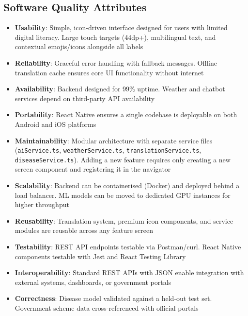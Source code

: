 \documentclass[12pt,a4paper]{article}
\begin{document}
\subsection{Software Quality Attributes}

\begin{itemize}
    \item \textbf{Usability}: Simple, icon-driven interface designed for users with limited digital literacy. Large touch targets (44dp+), multilingual text, and contextual emojis/icons alongside all labels
    \item \textbf{Reliability}: Graceful error handling with fallback messages. Offline translation cache ensures core UI functionality without internet
    \item \textbf{Availability}: Backend designed for 99\% uptime. Weather and chatbot services depend on third-party API availability
    \item \textbf{Portability}: React Native ensures a single codebase is deployable on both Android and iOS platforms
    \item \textbf{Maintainability}: Modular architecture with separate service files (\texttt{aiService.ts}, \texttt{weatherService.ts}, \texttt{translationService.ts}, \texttt{diseaseService.ts}). Adding a new feature requires only creating a new screen component and registering it in the navigator
    \item \textbf{Scalability}: Backend can be containerised (Docker) and deployed behind a load balancer. ML models can be moved to dedicated GPU instances for higher throughput
    \item \textbf{Reusability}: Translation system, premium icon components, and service modules are reusable across any feature screen
    \item \textbf{Testability}: REST API endpoints testable via Postman/curl. React Native components testable with Jest and React Testing Library
    \item \textbf{Interoperability}: Standard REST APIs with JSON enable integration with external systems, dashboards, or government portals
    \item \textbf{Correctness}: Disease model validated against a held-out test set. Government scheme data cross-referenced with official portals
\end{itemize}

\end{document}
